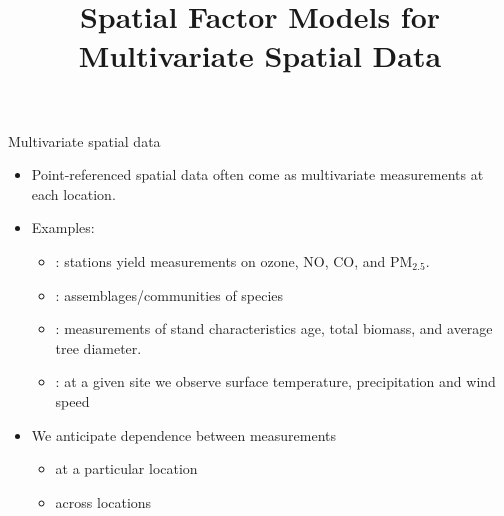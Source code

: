 



\title[]{Spatial Factor Models for Multivariate Spatial Data}




\maketitle

\begin{frame}{Multivariate spatial data}

\begin{itemize}
\item Point-referenced spatial data often come as multivariate measurements at each location.\pause

\item Examples:
\begin{itemize}
	\item {}: stations yield measurements on ozone, NO, CO, and $\text{PM}_{2.5}$.\pause
	\item {}: assemblages/communities of species \pause
	\item {}: measurements of stand characteristics age, total biomass, and average tree diameter.\pause
	\item {}: at a given site we observe surface temperature, precipitation and wind speed \pause
\end{itemize}

\item We anticipate dependence between measurements %
\begin{itemize}
\item at a particular location%
\item across locations
\end{itemize}
\end{itemize}
\end{frame}

